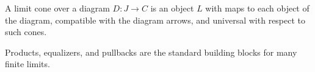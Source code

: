 \begin{definition}
A limit cone over a diagram $D : J \to C$ is an object $L$ with maps to each object of the diagram, compatible with the diagram arrows, and universal with respect to such cones.
\end{definition}

\begin{remark}
Products, equalizers, and pullbacks are the standard building blocks for many finite limits.
\end{remark}
